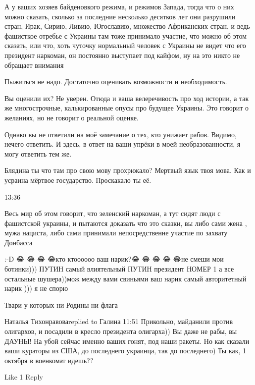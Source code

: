 
А у ваших хозяев байденовкого режима, и режимов Запада, тогда что о них можно
сказать, сколько за последние несколько десятков лет они разрушили стран, Ирак,
Сирию, Ливию, Югославию, множество Африканских стран, и ведь фашисткое отребье
с Украины там тоже принимало участие, что можно об этом сказать, или что, хоть
чуточку нормальный человек с Украины не видет что его президент наркоман, он
постоянно выступает под кайфом, ну на это никто не обращает внимания


Пыжиться не надо. Достаточно оценивать возможности и необходимость.

Вы оценили их? Не уверен. Отюда и ваша велеречивость про ход истории, а так же
многострочные, калькированные опусы про будущее Украины. Это говорит о
желаниях, но не говорит о реальной оценке.

Однако вы не ответили на моё замечание о тех, кто унижает рабов. Видимо, нечего
ответить. И здесь, в ответ на ваши упрёки в моей необразованности, я могу
ответить тем же.

Блядина ты что там про свою мову прохрюкало? Мертвый язык твоя мова. Как и
усраина мёртвое государство. Проскакало ты её.

13:36

Весь мир об этом говорит, что зеленский наркоман, а тут сидят люди с фашистской
украины, и пытаются доказать что это сказки, вы либо сами жена , мужа нациста,
либо сами принимали непосредственне участие по захвату Донбасса


:-D 😂 😂 😂 😂кто ктоооооо ваш нарик?😂 😂 😂 😂 😂не смеши мои ботинки)))
ПУТИН самый влиятельный ПУТИН президент НОМЕР 1 а все остальные шушера))мож
между вами свиньями ваш нарик самый авторитетный нарик ))) я не спорю

Твари у которых ни Родины ни флага

Наталья Тихонравоваreplied to Галина
11:51
Прикольно, майданили против олигархов, и посадили в кресло президента олигарха)) Вы даже не рабы, вы ДАУНЫ! На убой сейчас именно ваших гонят, под наши ракеты. Но как сказали ваши кураторы из США, до последнего украинца, так до последнего) Ты как, 1 октября в военкомат идешь??

    Like 1
    Reply

